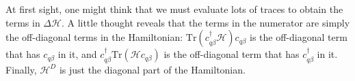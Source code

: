 At first sight, one might think that we must evaluate lots of traces to obtain the terms in \(\Delta \mathcal{H}\). A little thought reveals that the terms in the numerator are simply the off-diagonal terms in the Hamiltonian: \(\text{Tr}\left(c^\dagger_{q\beta}\mathcal{H} \right)c_{q\beta}\) is the off-diagonal term that has \(c_{q\beta}\) in it, and \(c_{q\beta}^\dagger \text{Tr}\left(\mathcal{H} c_{q\beta}\right)\) is the off-diagonal term that has \(c^\dagger_{q\beta}\) in it. Finally, \(\mathcal{H}^D\) is just the diagonal part of the Hamiltonian.

%
%
%
